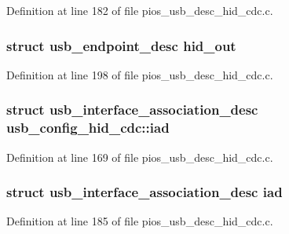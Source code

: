 Definition at line 182 of file pios\-\_\-usb\-\_\-desc\-\_\-hid\-\_\-cdc.\-c.

\hypertarget{group___p_i_o_s___u_s_b___d_e_s_c_ga0e5a30c27a737b9c3e117e4e8b755b8d}{
\subsubsection[{hid\-\_\-out}]{\setlength{\rightskip}{0pt plus 5cm}struct {\bf usb\-\_\-endpoint\-\_\-desc} hid\-\_\-out}}\label{group___p_i_o_s___u_s_b___d_e_s_c_ga0e5a30c27a737b9c3e117e4e8b755b8d}


Definition at line 198 of file pios\-\_\-usb\-\_\-desc\-\_\-hid\-\_\-cdc.\-c.

\hypertarget{group___p_i_o_s___u_s_b___d_e_s_c_ga0dc1bab4cabd04ace89b858ba3f7b259}{
\subsubsection[{iad}]{\setlength{\rightskip}{0pt plus 5cm}struct {\bf usb\-\_\-interface\-\_\-association\-\_\-desc} usb\-\_\-config\-\_\-hid\-\_\-cdc\-::iad}}\label{group___p_i_o_s___u_s_b___d_e_s_c_ga0dc1bab4cabd04ace89b858ba3f7b259}


Definition at line 169 of file pios\-\_\-usb\-\_\-desc\-\_\-hid\-\_\-cdc.\-c.

\hypertarget{group___p_i_o_s___u_s_b___d_e_s_c_gac7a66f23a9fc26df56f67aa5cc34dc5b}{
\subsubsection[{iad}]{\setlength{\rightskip}{0pt plus 5cm}struct {\bf usb\-\_\-interface\-\_\-association\-\_\-desc} iad}}\label{group___p_i_o_s___u_s_b___d_e_s_c_gac7a66f23a9fc26df56f67aa5cc34dc5b}


Definition at line 185 of file pios\-\_\-usb\-\_\-desc\-\_\-hid\-\_\-cdc.\-c.

